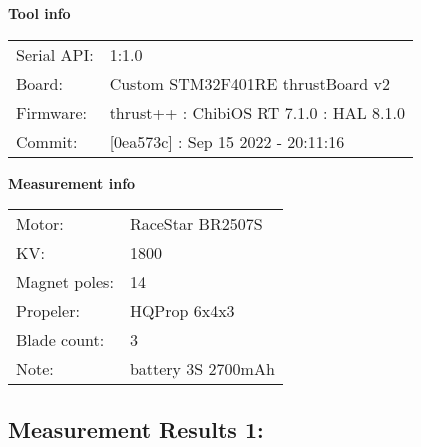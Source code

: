 \documentclass[10pt]{article}
\begin{document}
\noindent
{\large \bf Tool info}
\vspace{3mm}

\noindent
\begin{tabular}{ll}
Serial API:  & 1:1.0\\ 
Board:       & Custom STM32F401RE thrustBoard v2\\ 
Firmware:    & thrust++ : ChibiOS RT 7.1.0 : HAL 8.1.0\\ 
Commit:      & [0ea573c] : Sep 15 2022 - 20:11:16
\end{tabular}
\vspace{3mm}

\noindent
{\large \bf Measurement info}
\vspace{3mm}

\noindent
\begin{tabular}{ll}
Motor:        & RaceStar BR2507S\\ 
KV:           & 1800\\ 
Magnet poles: & 14\\ 
Propeler:     & HQProp 6x4x3\\ 
Blade count:  & 3\\ 
Note:         & battery 3S 2700mAh
\end{tabular}

\vspace{3mm}


\subsection*{\large \bf Measurement Results 1:}
\end{document}
